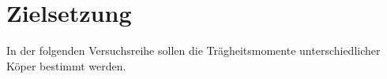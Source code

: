 \section{Zielsetzung}
\label{sec:Zielsetzung}

In der folgenden Versuchsreihe sollen die Trägheitsmomente unterschiedlicher Köper bestimmt werden.
